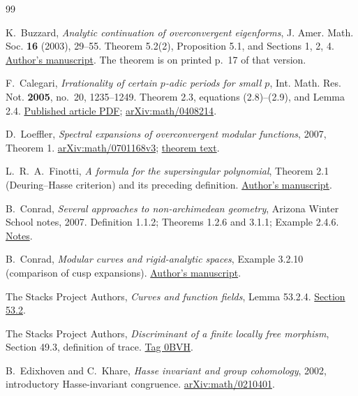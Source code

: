 \documentclass[11pt,a4paper]{article}
\begin{document}
\clearpage
\begin{thebibliography}{99}
\raggedright

K.~Buzzard, \emph{Analytic continuation of overconvergent eigenforms},
J. Amer. Math. Soc. \textbf{16} (2003), 29--55.
Theorem 5.2(2), Proposition 5.1, and Sections 1, 2, 4.
\href{https://www.ma.imperial.ac.uk/~buzzard/maths/research/papers/wild6.pdf}{Author's manuscript}.
The theorem is on printed p.~17 of that version.

F.~Calegari, \emph{Irrationality of certain \(p\)-adic periods for small \(p\)},
Int. Math. Res. Not. \textbf{2005}, no.~20, 1235--1249.
Theorem 2.3, equations (2.8)--(2.9), and Lemma 2.4.
\href{https://www.math.uchicago.edu/~fcale/papers/Beukers.pdf}{Published article PDF};
\href{https://arxiv.org/abs/math/0408214}{arXiv:math/0408214}.

D.~Loeffler, \emph{Spectral expansions of overconvergent modular functions},
2007, Theorem 1.
\href{https://arxiv.org/abs/math/0701168v3}{arXiv:math/0701168v3};
\href{https://arxiv.org/html/math/0701168v3#S2}{theorem text}.

L.~R.~A.~Finotti, \emph{A formula for the supersingular polynomial},
Theorem 2.1 (Deuring--Hasse criterion) and its preceding definition.
\href{https://luisfinotti.org/math/papers/sspol.pdf}{Author's manuscript}.

B.~Conrad, \emph{Several approaches to non-archimedean geometry},
Arizona Winter School notes, 2007.
Definition 1.1.2; Theorems 1.2.6 and 3.1.1; Example 2.4.6.
\href{https://swc-math.github.io/aws/2007/ConradNotes11Mar.pdf}{Notes}.

B.~Conrad, \emph{Modular curves and rigid-analytic spaces},
Example 3.2.10 (comparison of cusp expansions).
\href{https://math.stanford.edu/~conrad/papers/genpaper.pdf}{Author's manuscript}.

The Stacks Project Authors, \emph{Curves and function fields},
Lemma 53.2.4.
\href{https://stacks.math.columbia.edu/tag/0BXX}{Section 53.2}.

The Stacks Project Authors,
\emph{Discriminant of a finite locally free morphism},
Section 49.3, definition of trace.
\href{https://stacks.math.columbia.edu/tag/0BVH}{Tag 0BVH}.

B.~Edixhoven and C.~Khare, \emph{Hasse invariant and group cohomology},
2002, introductory Hasse-invariant congruence.
\href{https://arxiv.org/abs/math/0210401}{arXiv:math/0210401}.


\end{thebibliography}
\end{document}
